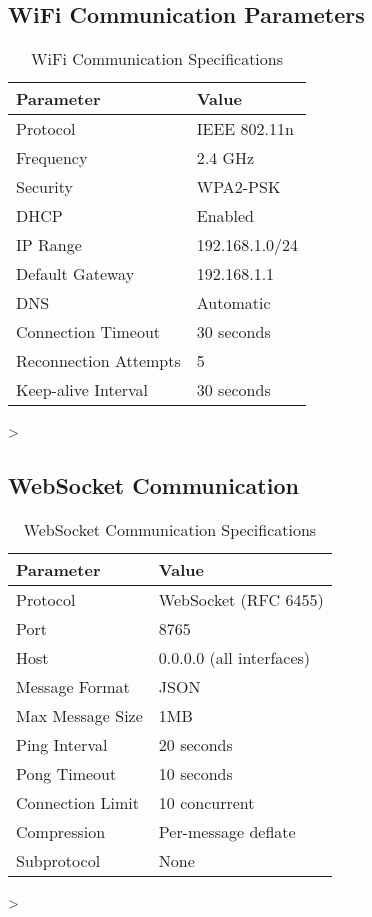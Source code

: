 \subsection{WiFi Communication Parameters}

\begin{table}[H]
\centering
\caption{WiFi Communication Specifications}
\begin{tabular}{|l|l|}
\hline
\textbf{Parameter} & \textbf{Value} \\
\hline
Protocol & IEEE 802.11n \\
Frequency & 2.4 GHz \\
Security & WPA2-PSK \\
DHCP & Enabled \\
IP Range & 192.168.1.0/24 \\
Default Gateway & 192.168.1.1 \\
DNS & Automatic \\
Connection Timeout & 30 seconds \\
Reconnection Attempts & 5 \\
Keep-alive Interval & 30 seconds \\
\hline
\end{tabular}
\label{tab:wifi}
\end{table}>

\subsection{WebSocket Communication}

\begin{table}[H]
\centering
\caption{WebSocket Communication Specifications}
\begin{tabular}{|l|l|}
\hline
\textbf{Parameter} & \textbf{Value} \\
\hline
Protocol & WebSocket (RFC 6455) \\
Port & 8765 \\
Host & 0.0.0.0 (all interfaces) \\
Message Format & JSON \\
Max Message Size & 1MB \\
Ping Interval & 20 seconds \\
Pong Timeout & 10 seconds \\
Connection Limit & 10 concurrent \\
Compression & Per-message deflate \\
Subprotocol & None \\
\hline
\end{tabular}
\label{tab:websocket}
\end{table}>

